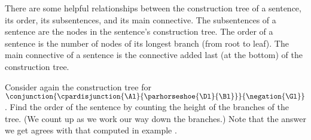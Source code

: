 \noindent{}There are some helpful relationships between the construction tree of a sentence,  its order, its subsentences, and its main connective. 
The subsentences of a sentence are the nodes in the sentence's construction tree.
The order of a sentence is the number of nodes of its longest branch (from root to leaf). 
The main connective of a sentence is the connective added last (at the bottom) of the construction tree. 
\begin{majorILnc}{}
Consider again the construction tree for $\conjunction{\cpardisjunction{\Al}{\parhorseshoe{\Dl}{\Bl}}}{\negation{\Gl}}$. 
Find the order of the sentence by counting the height of the branches of the tree. 
(We count up as we work our way down the branches.)
Note that the answer we get agrees with that computed in example .
\begin{center}
\end{center}
\end{majorILnc}

